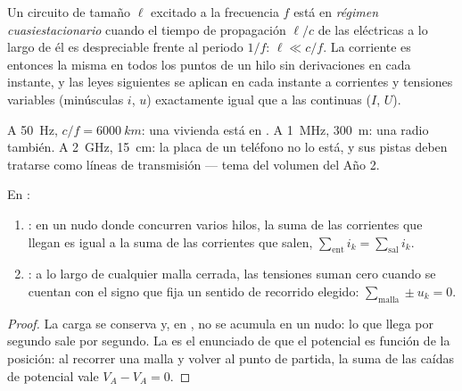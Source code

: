 \begin{definition}\label{def:b1:dc-circuits:arqs}
Un circuito de tamaño $\ell$ excitado a la frecuencia $f$ está en
\emph{régimen cuasiestacionario} cuando el tiempo de propagación $\ell/c$
de las  eléctricas a lo largo de él es despreciable frente al
periodo $1/f$: $\ell \ll c/f$. La corriente es entonces la misma en todos
los puntos de un hilo sin derivaciones en cada instante, y las leyes
siguientes se aplican en cada instante a corrientes y tensiones variables
(minúsculas $i$, $u$) exactamente igual que a las continuas ($I$, $U$).
\end{definition}

\begin{example}\label{ex:b1:dc-circuits:arqs}
A \qty{50}{Hz}, $c/f = \qty{6000}{km}$: una vivienda está en . A \qty{1}{MHz}, \qty{300}{m}: una radio también. A
\qty{2}{GHz}, \qty{15}{cm}: la placa de un teléfono no lo está, y sus
pistas deben tratarse como líneas de transmisión --- tema del volumen del
Año 2.
\end{example}

\begin{theorem}\label{thm:b1:dc-circuits:kirchhoff}
En :
\begin{enumerate}
  \item \emph{}: en un nudo donde concurren varios hilos,
        la suma de las corrientes que llegan es igual a la suma de las
        corrientes que salen, $\sum_{\text{ent}} i_k = \sum_{\text{sal}} i_k$.
  \item \emph{}: a lo largo de cualquier malla cerrada,
        las tensiones suman cero cuando se cuentan con el signo que fija un
        sentido de recorrido elegido: $\sum_{\text{malla}} \pm u_k = 0$.
\end{enumerate}
\end{theorem}

\begin{proof}
La carga se conserva y, en , no se acumula en un
nudo: lo que llega por segundo sale por segundo. La  es
el enunciado de que el potencial es función de la posición: al recorrer
una malla y volver al punto de partida, la suma de las caídas de potencial
vale $V_A - V_A = 0$.
\end{proof}

